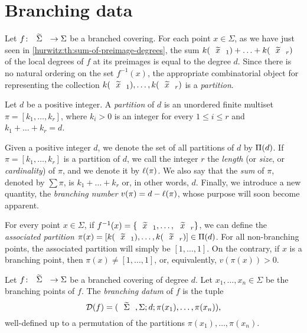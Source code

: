 \section{Branching data}

Let $\map{f}{\tSigma}{\Sigma}$ be a branched covering. For each point $x\in\Sigma$, as we have just seen in \cref{hurwitz:th:sum-of-preimage-degrees}, the sum $k(\wtilde{x}_1)+\ldots+k(\wtilde{x}_r)$ of the local degrees of $f$ at its preimages is equal to the degree $d$. Since there is no natural ordering on the set $f^{-1}(x)$, the appropriate combinatorial object for representing the collection $k(\wtilde{x}_1),\ldots,k(\wtilde{x}_r)$ is a \emph{partition}.

\begin{definition}
Let $d$ be a positive integer. A \emph{partition} of $d$ is an unordered finite multiset $\pi=[k_1,\ldots,k_r]$, where $k_i>0$ is an integer for every $1\le i\le r$ and $k_1+\ldots+k_r=d$.
\end{definition}

Given a positive integer $d$, we denote the set of all partitions of $d$ by $\Pi(d)$. If $\pi=[k_1,\ldots,k_r]$ is a partition of $d$, we call the integer $r$ the \emph{length} (or \emph{size}, or \emph{cardinality}) of $\pi$, and we denote it by $\ell(\pi)$. We also say that the \emph{sum} of $\pi$, denoted by $\sum\pi$, is $k_1+\ldots+k_r$ or, in other words, $d$. Finally, we introduce a new quantity, the \emph{branching number} $v(\pi)=d-\ell(\pi)$, whose purpose will soon become apparent.

For every point $x\in\Sigma$, if $f^{-1}(x)=\{\wtilde{x}_1,\ldots,\wtilde{x}_r\}$, we can define the \emph{associated partition} $\pi(x)=[k(\wtilde{x}_1),\ldots,k(\wtilde{x}_r)]\in\Partitions{d}$. For all non-branching points, the associated partition will simply be $[1,\ldots,1]$. On the contrary, if $x$ is a branching point, then $\pi(x)\neq[1,\ldots,1]$, or, equivalently, $v(\pi(x))>0$.

\begin{definition}
Let $\map{f}{\tSigma}{\Sigma}$ be a branched covering of degree $d$. Let $x_1,\ldots,x_n\in\Sigma$ be the branching points of $f$. The \emph{branching datum} of $f$ is the tuple
\[
\DD(f)=\datum{\tSigma,\Sigma}{d}{\pi(x_1),\ldots,\pi(x_n)},
\]
well-defined up to a permutation of the partitions $\pi(x_1),\ldots,\pi(x_n)$.
\end{definition}

